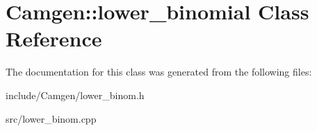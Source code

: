 \hypertarget{a00334}{}\section{Camgen\+:\+:lower\+\_\+binomial Class Reference}
\label{a00334}


The documentation for this class was generated from the following files\+:\begin{DoxyCompactItemize}
\item 
include/\+Camgen/lower\+\_\+binom.\+h\item 
src/lower\+\_\+binom.\+cpp\end{DoxyCompactItemize}
